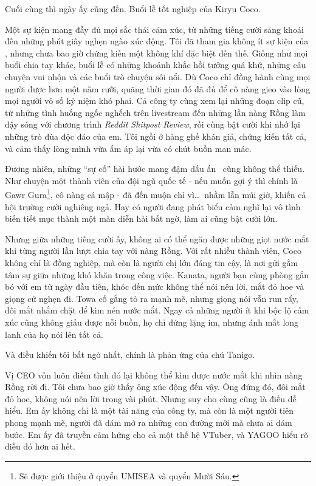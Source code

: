 \documentclass[../main.tex]{subfiles}
\begin{document}
\omk

Cuối cùng thì ngày ấy cũng đến. Buổi lễ tốt nghiệp của Kiryu Coco.

Một sự kiện mang đầy đủ mọi sắc thái cảm xúc, từ những tiếng cười sảng khoái đến những phút giây nghẹn ngào xúc động. Tôi đã tham gia không ít sự kiện của \hll, nhưng chưa bao giờ chứng kiến một không khí đặc biệt đến thế. Giống như mọi buổi chia tay khác, buổi lễ có những khoảnh khắc hồi tưởng quá khứ, những câu chuyện vui nhộn và các buổi trò chuyện sôi nổi. Dù Coco chỉ đồng hành cùng mọi người được hơn một năm rưỡi, quãng thời gian đó đã đủ để cô nàng gieo vào lòng mọi người vô số kỷ niệm khó phai. Cả công ty cùng xem lại những đoạn clip cũ, từ những tình huống ngốc nghếch trên livestream đến những lần nàng Rồng làm dậy sóng với chương trình \textit{Reddit Shitpost Review}, rồi cùng bật cười khi nhớ lại những trò đùa độc đáo của em. Tôi ngồi ở hàng ghế khán giả, chứng kiến tất cả, và cảm thấy lòng mình vừa ấm áp lại vừa có chút buồn man mác.

Đương nhiên, những ``sự cố'' hài hước mang đậm dấu ấn \hll\ cũng không thể thiếu. Như chuyện một thành viên của đội ngũ quốc tế - nếu muốn gợi ý thì chính là Gawr Gura\footnote{Sẽ được giới thiệu ở quyển UMISEA và quyển Mười Sáu.}, cô nàng cá mập - đã đến muộn chỉ vì\dots\ nhầm lẫn múi giờ, khiến cả hội trường cười nghiêng ngả. Hay có người đang phát biểu cảm nghĩ lại vô tình biến tiết mục thành một màn diễn hài bất ngờ, làm ai cũng bật cười lớn.

Nhưng giữa những tiếng cười ấy, không ai có thể ngăn được những giọt nước mắt khi từng người lần lượt chia tay với nàng Rồng. Với rất nhiều thành viên, Coco không chỉ là đồng nghiệp, mà còn là người chị lớn đáng tin cậy, là nơi gửi gắm tâm sự giữa những khó khăn trong công việc. Kanata, người bạn cùng phòng gắn bó với em từ ngày đầu tiên, khóc đến mức không thể nói nên lời, mắt đỏ hoe và giọng cứ nghẹn đi. Towa cố gắng tỏ ra mạnh mẽ, nhưng giọng nói vẫn run rẩy, đôi mắt nhắm chặt để kìm nén nước mắt. Ngay cả những người ít khi bộc lộ cảm xúc cũng không giấu được nỗi buồn, họ chỉ đứng lặng im, nhưng ánh mắt long lanh của họ nói lên tất cả.

Và điều khiến tôi bất ngờ nhất, chính là phản ứng của chú Tanigo.

Vị CEO vốn luôn điềm tĩnh đó lại không thể kìm được nước mắt khi nhìn nàng Rồng rời đi. Tôi chưa bao giờ thấy ông xúc động đến vậy. Ông đứng đó, đôi mắt đỏ hoe, không nói nên lời trong vài phút. Nhưng suy cho cùng cũng là điều dễ hiểu. Em ấy không chỉ là một tài năng của công ty, mà còn là một người tiên phong mạnh mẽ, người đã dám mở ra những con đường mới mà chưa ai dám bước. Em ấy đã truyền cảm hứng cho cả một thế hệ VTuber, và YAGOO hiểu rõ điều đó hơn ai hết.
\end{document}
